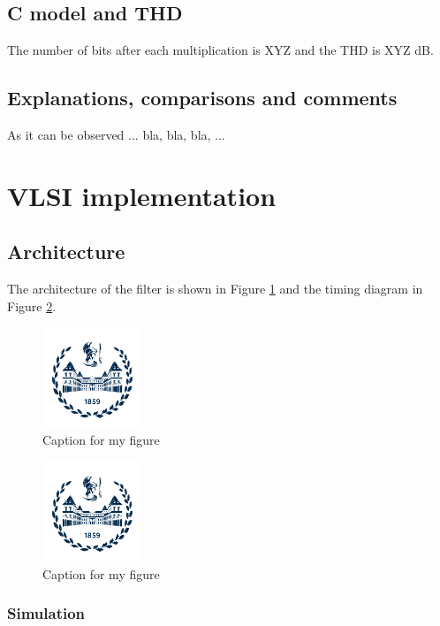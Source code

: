 \subsection{C model and THD}

The number of bits after each multiplication is XYZ and the THD is XYZ dB.

\subsection{Explanations, comparisons and comments}

As it can be observed ... bla, bla, bla, ...

\section{VLSI implementation}

\subsection{Architecture}

The architecture of the filter is shown in Figure \ref{fig:lab1:fig2} and the timing diagram in Figure \ref{fig:lab1:fig3}.

\begin{figure}[h]
  \centering
  \includegraphics[width=3cm]{./logopoli_new}
  \caption{Caption for my figure}
  \label{fig:lab1:fig2}
\end{figure}

\begin{figure}[h]
  \centering
  \includegraphics[width=3cm]{./logopoli_new}
  \caption{Caption for my figure}
  \label{fig:lab1:fig3}
\end{figure}

\subsubsection{Simulation}

